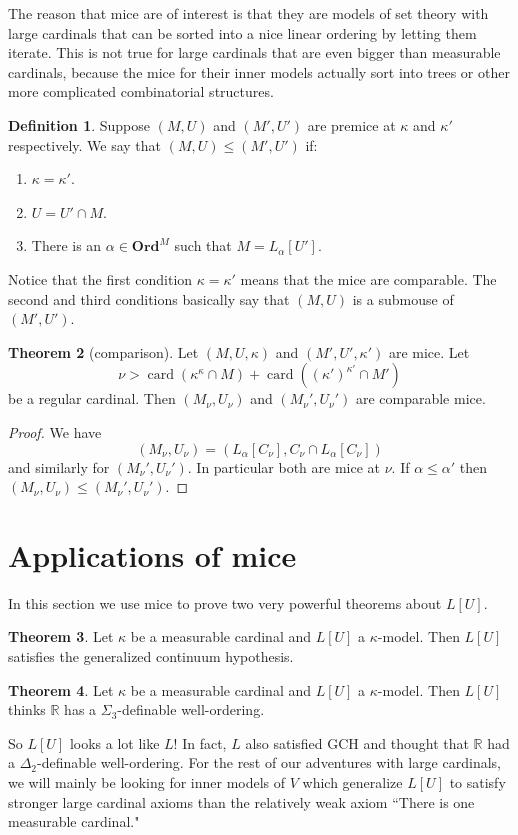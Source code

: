 \documentclass[12pt]{report}
\newcommand{\RR}{\mathbb{R}}
\newcommand{\card}{\operatorname{card}}
\newcommand{\Ord}{\mathbf{Ord}}
\theoremstyle{definition}
\newtheorem{theorem}{Theorem}[chapter]
\newtheorem{definition}[theorem]{Definition}
\begin{document}
The reason that mice are of interest is that they are models of set theory with large cardinals that can be sorted into a nice linear ordering by letting them iterate.
This is not true for large cardinals that are even bigger than measurable cardinals, because the mice for their inner models actually sort into trees or other more complicated combinatorial structures.
\begin{definition}
Suppose $(M, U)$ and $(M', U')$ are premice at $\kappa$ and $\kappa'$ respectively. We say that $(M, U) \leq (M', U')$ if:
\begin{enumerate}
\item $\kappa = \kappa'$.
\item $U = U' \cap M$.
\item There is an $\alpha \in \Ord^M$ such that $M = L_\alpha[U']$.
\end{enumerate}
\end{definition}
Notice that the first condition $\kappa = \kappa'$ means that the mice are comparable. The second and third conditions basically say that $(M, U)$ is a submouse of $(M', U')$.
\begin{theorem}[comparison]
Let $(M, U, \kappa)$ and $(M', U', \kappa')$ are mice. Let
$$\nu > \card(\kappa^\kappa \cap M) + \card((\kappa')^{\kappa'} \cap M')$$
be a regular cardinal.
Then $(M_\nu, U_\nu)$ and $(M_\nu', U_\nu')$ are comparable mice.
\end{theorem}
\begin{proof}
We have
$$(M_\nu, U_\nu) = (L_\alpha[C_\nu], C_\nu \cap L_\alpha[C_\nu])$$
and similarly for $(M_\nu', U_\nu')$. In particular both are mice at $\nu$.
If $\alpha \leq \alpha'$ then $(M_\nu, U_\nu) \leq (M_\nu', U_\nu')$.
\end{proof}

\section{Applications of mice}
In this section we use mice to prove two very powerful theorems about $L[U]$.
\begin{theorem}
Let $\kappa$ be a measurable cardinal and $L[U]$ a $\kappa$-model. Then $L[U]$ satisfies the generalized continuum hypothesis.
\end{theorem}
\begin{theorem}
Let $\kappa$ be a measurable cardinal and $L[U]$ a $\kappa$-model. Then $L[U]$ thinks $\RR$ has a $\Sigma_3$-definable well-ordering.
\end{theorem}
So $L[U]$ looks a lot like $L$! In fact, $L$ also satisfied GCH and thought that $\RR$ had a $\Delta_2$-definable well-ordering.
For the rest of our adventures with large cardinals, we will mainly be looking for inner models of $V$ which generalize $L[U]$ to satisfy stronger large cardinal axioms than the relatively weak axiom ``There is one measurable cardinal."
\end{document}
